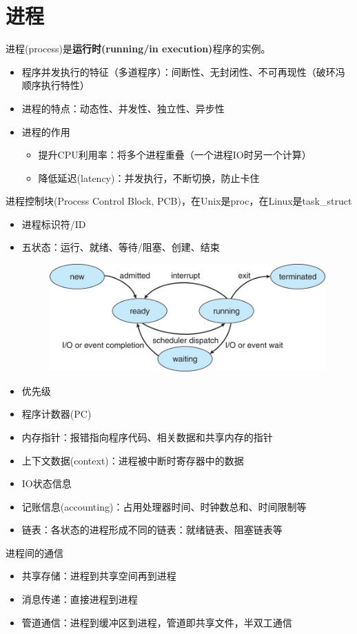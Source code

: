 
\section{进程}
进程(process)是\textbf{运行时(running/in execution)}程序的实例。
\begin{itemize}
	\item 程序并发执行的特征（多道程序）：间断性、无封闭性、不可再现性（破环冯顺序执行特性）
	\item 进程的特点：动态性、并发性、独立性、异步性
	\item 进程的作用
	\begin{itemize}
		\item 提升CPU利用率：将多个进程重叠（一个进程IO时另一个计算）
		\item 降低延迟(latency)：并发执行，不断切换，防止卡住
	\end{itemize}
\end{itemize}

进程控制块(Process Control Block, PCB)，在Unix是proc，在Linux是task\_struct
\begin{itemize}
	\item 进程标识符/ID
	\item 五状态：运行、就绪、等待/阻塞、创建、结束
	\begin{figure}[H]
	\centering
	\includegraphics[width=0.6\linewidth]{fig/5-state-process-model.jpg}
	\end{figure}
	\item 优先级
	\item 程序计数器(PC)
	\item 内存指针：报错指向程序代码、相关数据和共享内存的指针
	\item 上下文数据(context)：进程被中断时寄存器中的数据
	\item IO状态信息
	\item 记账信息(accounting)：占用处理器时间、时钟数总和、时间限制等
	\item 链表：各状态的进程形成不同的链表：就绪链表、阻塞链表等
\end{itemize}

进程间的通信
\begin{itemize}
	\item 共享存储：进程到共享空间再到进程
	\item 消息传递：直接进程到进程
	\item 管道通信：进程到缓冲区到进程，管道即共享文件，半双工通信
\end{itemize}

